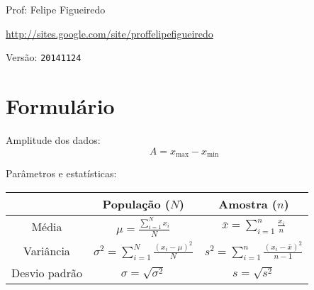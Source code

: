 \documentclass[a4paper]{article}
\begin{document}
\parbox[c]{.825\textwidth}{\raggedright%
{Prof: Felipe Figueiredo\par}
{\url{http://sites.google.com/site/proffelipefigueiredo}\par}
}

Versão: \verb|20141124|




\section{Formulário}


Amplitude dos dados:
\begin{displaymath}
  A = x_\text{max} - x_\text{min}
\end{displaymath}

Parâmetros e estatísticas:
\begin{center}
  \begin{tabular}[!h]{|c|c|c|}
    \hline
     & População ($N$) & Amostra ($n$) \\
    \hline
    Média & $\mu = \frac{\sum_{i=1}^N x_i}{N}$ & $\bar{x} = \sum_{i=1}^n
    \frac{x_i}{n}$\\
    \hline
    Variância & $\sigma^2 = \sum_{i=1}^N \frac{(x_i - \mu)^2}{N}$& $s^2 = \sum_{i=1}^n \frac{(x_i - \bar{x})^2}{n-1}$
    \\
    \hline
    Desvio padrão & $\sigma = \sqrt{\sigma^2}$& $s = \sqrt{s^2}$\\
    \hline
  \end{tabular}
\end{center}




\end{document}
